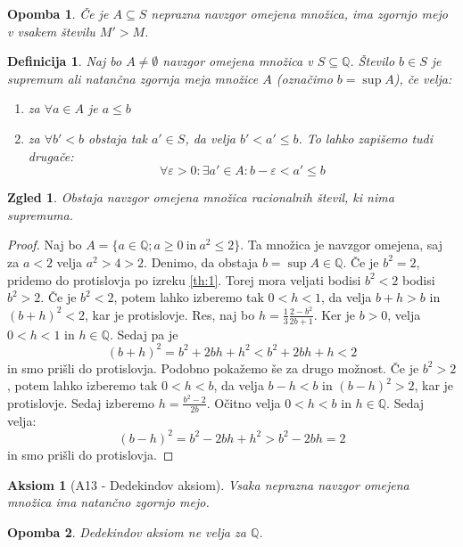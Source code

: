 \documentclass[10pt, a4paper]{article}
\newtheorem{defi}{Definicija}[section]
\newtheorem{aksiom}{Aksiom}[section]
\newenvironment{noticeB}{%
  \tcolorbox[%
  notitle,
  empty,
  enhanced,  %
  breakable,
  coltext=black,
  colback=white, 
  fontupper=\rmfamily,
  parbox=false,
  noparskip,
  sharp corners,
  boxrule=-1pt,  %
  frame hidden,
  left=7pt,  %
  right=7pt,
  top=5pt,
  bottom=5pt,
  before skip=2.5ex plus 2pt,
  after skip=2.5ex plus 2pt,
  borderline west = {1.5pt}{-0.1pt}{blue!30!black}, %
  overlay unbroken and last={%
    \draw[color=black, line width=1.25pt]
    ($(frame.south west)+(1.pt, -0.1pt)$) -- ++(2em, 0);
  }
  ]}
{\endtcolorbox}
\newenvironment{definicija}{\begin{defi}\begin{noticeB}}{%
    \end{noticeB}\end{defi}}
\newtheorem*{opomba}{Opomba}
\newtheorem{zgled}{Zgled}[section]
\newenvironment{noticeC}{%
  \tcolorbox[%
  notitle,
  empty,
  enhanced,  %
  breakable,
  coltext=black, 
  fontupper=\rmfamily,
  parbox=false,
  noparskip,
  sharp corners,
  boxrule=-1pt,  %
  frame hidden,
  left=7pt,  %
  right=7pt,
  top=5pt,
  bottom=5pt,
  before skip=2.5ex plus 2pt,
  after skip=2.5ex plus 2pt,
  overlay unbroken and last={%
  },
  ]}
{\endtcolorbox}
\newenvironment{dokaz}%
  {\begin{noticeC}\begin{proof}}%
  {\end{proof}\end{noticeC}}
\newcommand{\Q}{\mathbb {Q}}
\begin{document}
\begin{opomba}
    Če je $A \subseteq S$ neprazna navzgor omejena množica, ima zgornjo mejo v vsakem številu $M'>M$.
\end{opomba}
    
\begin{definicija}
    Naj bo $A \neq \emptyset$ navzgor omejena množica v $S \subseteq \mathbb{Q}$. Število $b \in S$ je {supremum} ali natančna zgornja meja množice $A$ (označimo $b = \sup A$), če velja:
    \begin{enumerate}
    \item za $\forall a \in A$ je $a\leq b$
    \item za $\forall b'<b$ obstaja tak $a' \in S$, da velja $b' < a' \leq b$. To lahko zapišemo tudi drugače: $$\forall \varepsilon > 0: \exists a' \in A: b-\varepsilon < a' \leq b$$
    \end{enumerate}
\end{definicija}
    
\begin{zgled}
    Obstaja navzgor omejena množica racionalnih števil, ki nima supremuma.
\end{zgled}    
    \begin{dokaz}
    Naj bo $A = \{a \in \mathbb{Q}; a\geq 0\ \text{in}\ a^2 \leq 2\}$.
    Ta množica je navzgor omejena, saj za $a < 2$ velja $a^2 > 4 > 2$.
     Denimo, da obstaja $b = \sup A \in \mathbb{Q}$.
        Če je $b^2=2$, pridemo do protislovja po izreku \ref{th:1}. Torej mora veljati bodisi $b^2<2$ bodisi $b^2>2$.
        Če je $b^2<2$, potem lahko izberemo tak $0<h<1$, da velja $b+h>b$ in $(b+h)^2<2$, kar je protislovje.
        Res, naj bo $h = \frac{1}{3} \frac{2-b^2}{2b+1}$. Ker je $b > 0$, velja $0 < h < 1$ in $h \in \Q$.
        Sedaj pa je $$(b+h)^2 = b^2 + 2bh + h^2 < b^2 + 2bh + h < 2$$ in smo prišli do protislovja.
        Podobno pokažemo še za drugo možnost. Če je $b^2>2$, potem lahko izberemo tak $0<h<b$, da velja $b-h<b$ in $(b-h)^2>2$, kar je protislovje.
        Sedaj izberemo $h = \frac{b^2-2}{2b}$. Očitno velja $0 < h < b$ in $h \in \Q$.
        Sedaj velja: $$(b-h)^2 = b^2 - 2bh + h^2 > b^2 - 2bh = 2$$ in smo prišli do protislovja.
    \end{dokaz}


\begin{aksiom}[A13 - Dedekindov aksiom]
    Vsaka neprazna navzgor omejena množica ima natančno zgornjo mejo.
\end{aksiom}

\begin{opomba}
    Dedekindov aksiom ne velja za $\mathbb{Q}$.
\end{opomba}
\end{document}
